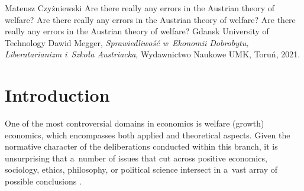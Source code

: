 \begin{newrevengenv}{Mateusz Czyżniewski}
	{Are there really any errors in the Austrian theory of welfare?}
	{Are there really any errors in the Austrian theory of welfare?}
	{Are there really any errors in the Austrian theory of welfare?}
	{Gdansk University of Technology\label{czyz-first}}
	{Dawid Megger, \textit{Sprawiedliwość 
	w~Ekonomii Dobrobytu, Liberatarianizm i~Szkoła Austriacka}, Wydawnictwo Naukowe UMK, Toruń, 2021.}
	
	
























\section{Introduction}

\lettrine[loversize=0.13,lines=2,lraise=-0.03,nindent=0em,findent=0.2pt]%
{O}{}ne of the most controversial domains in economics is welfare (growth) economics, which encompasses both applied and theoretical aspects. Given the normative character of the deliberations conducted within this branch, it is unsurprising that a~number of issues that cut across positive economics, sociology, ethics, philosophy, or political science intersect in a~vast array of possible conclusions 
\parencite[][]{davis_positive-normative_1998}.%





\end{newrevengenv}
